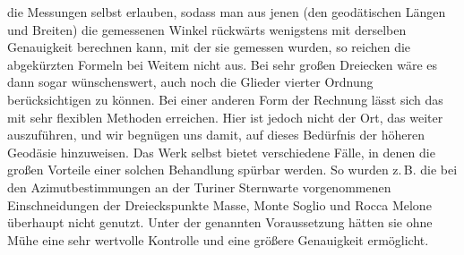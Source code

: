 %
die Messungen selbst erlauben, sodass man aus jenen (den geodätischen Längen und Breiten) die gemessenen Winkel rückwärts wenigstens mit derselben Genauigkeit berechnen kann, mit der sie gemessen wurden, so reichen die abgekürzten Formeln bei Weitem nicht aus. Bei sehr großen Dreiecken wäre es dann sogar wünschenswert, auch noch die Glieder vierter Ordnung berücksichtigen zu können. Bei einer anderen Form der Rechnung lässt sich das mit sehr flexiblen Methoden erreichen. Hier ist jedoch nicht der Ort, das weiter auszuführen, und wir begnügen uns damit, auf dieses Bedürfnis der höheren Geodäsie hinzuweisen. Das Werk selbst bietet verschiedene Fälle, in denen die großen Vorteile einer solchen Behandlung spürbar werden. So wurden z.\,B. die bei den Azimutbestimmungen an der Turiner Sternwarte vorgenommenen Einschneidungen der Dreieckspunkte Masse, Monte Soglio und Rocca Melone überhaupt nicht genutzt. Unter der genannten Voraussetzung hätten sie ohne Mühe eine sehr wertvolle Kontrolle und eine größere Genauigkeit ermöglicht.


